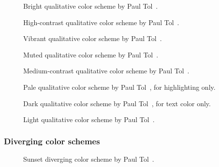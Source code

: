 \documentclass{scrartcl}
\begin{document}
\begin{figure}[ht]
    \centering
    \caption{Bright qualitative color scheme by Paul Tol~\cite{Tol}.}
    \label{fig:T-Q-B}
\end{figure}

\begin{figure}[ht]
    \centering
    \caption{High-contrast qualitative color scheme by Paul Tol~\cite{Tol}.}
    \label{fig:T-Q-HC}
\end{figure}

\begin{figure}[ht]
    \centering
    \caption{Vibrant qualitative color scheme by Paul Tol~\cite{Tol}.}
    \label{fig:T-Q-V}
\end{figure}

\begin{figure}[ht]
    \centering
    \caption{Muted qualitative color scheme by Paul Tol~\cite{Tol}.}
    \label{fig:T-Q-M}
\end{figure}

\begin{figure}[ht]
    \centering
    \caption{Medium-contrast qualitative color scheme by Paul Tol~\cite{Tol}.}
    \label{fig:T-Q-MC}
\end{figure}

\begin{figure}[ht]
    \centering
    \caption{Pale qualitative color scheme by Paul Tol~\cite{Tol}, for highlighting only.}
    \label{fig:T-Q-PH}
\end{figure}

\begin{figure}[ht]
    \centering
    \caption{Dark qualitative color scheme by Paul Tol~\cite{Tol}, for text color only.}
    \label{fig:T-Q-DT}
\end{figure}

\begin{figure}[ht]
    \centering
    \caption{Light qualitative color scheme by Paul Tol~\cite{Tol}.}
    \label{fig:T-Q-L}
\end{figure}

\subsubsection{Diverging color schemes}

\begin{figure}[ht]
    \centering
    \caption{Sunset diverging color scheme by Paul Tol~\cite{Tol}.}
    \label{fig:T-D-S}
\end{figure}
\end{document}
